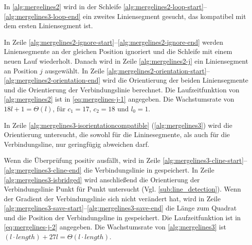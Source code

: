 In \autoref{alg:mergelines2} wird in der Schleife \ref{alg:mergelines2-loop-start}--\ref{alg:mergelines3-loop-end} ein
 zweites Liniensegment gesucht, das kompatibel mit dem ersten Liniensegment ist.

In Zeile \ref{alg:mergelines2-ignore-start}--\ref{alg:mergelines2-ignore-end} werden Liniensegmente an der gleichen
 Position ignoriert und die Schleife mit einem neuen Lauf wiederholt. Danach wird in Zeile \ref{alg:mergelines2-j} ein
 Liniensegment an Position $j$ ausgewählt. In Zeile
 \ref{alg:mergelines2-orientation-start}--\ref{alg:mergelines2-orientation-end} wird die Orientierung der beiden
 Liniensegmente und die Orientierung der Verbindungslinie berechnet. Die Laufzeitfunktion von \autoref{alg:mergelines2}
 ist in \autoref{eq:mergelines-j-1} angegeben. Die Wachstumsrate von $18l + 1 = \Theta(l)$, für $c_{1} = 17$,
 $c_{2} = 18$ und $l_{0} = 1$.

In Zeile \ref{alg:mergelines3-isorientationcompatible} (\autoref{alg:mergelines3}) wird die Orientierung untersucht,
 die sowohl für die Lininesegmente, als auch für die Verbindungsline, nur geringfügig abweichen darf.

Wenn die Überprüfung positiv ausfällt, wird in Zeile \ref{alg:mergelines3-cline-start}--\ref{alg:mergelines3-cline-end}
 die Verbindungslinie in  gespeichert. In Zeile \ref{alg:mergelines3-isbridged} wird anschließend die
 Orientierung der Verbindungslinie Punkt für Punkt untersucht (Vgl. \autoref{sub:line_detection}). Wenn der Gradient
 der Verbindungslinie sich nicht verändert hat, wird in Zeile
 \ref{alg:mergelines3-save-start}--\ref{alg:mergelines3-save-end} die Länge zum Quadrat und die Position der
 Verbindungsline in  gespeichert. Die Laufzeitfunktion ist in \autoref{eq:mergelines-j-2}
 angegeben. Die Wachstumsrate von \autoref{alg:mergelines3} ist
 $(l \cdot \mathit{length}) + 27l = \Theta(l \cdot \mathit{length})$.


